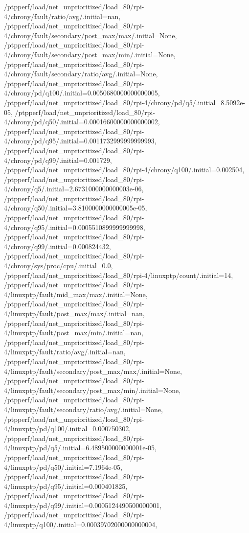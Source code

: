 {    /ptpperf/load/net_unprioritized/load_80/rpi-4/chrony/fault/ratio/avg/.initial=nan,
    /ptpperf/load/net_unprioritized/load_80/rpi-4/chrony/fault/secondary/post_max/max/.initial=None,
    /ptpperf/load/net_unprioritized/load_80/rpi-4/chrony/fault/secondary/post_max/min/.initial=None,
    /ptpperf/load/net_unprioritized/load_80/rpi-4/chrony/fault/secondary/ratio/avg/.initial=None,
    /ptpperf/load/net_unprioritized/load_80/rpi-4/chrony/pd/q100/.initial=0.0050680000000000005,
    /ptpperf/load/net_unprioritized/load_80/rpi-4/chrony/pd/q5/.initial=8.5092e-05,
    /ptpperf/load/net_unprioritized/load_80/rpi-4/chrony/pd/q50/.initial=0.00016600000000000002,
    /ptpperf/load/net_unprioritized/load_80/rpi-4/chrony/pd/q95/.initial=0.0011732999999999993,
    /ptpperf/load/net_unprioritized/load_80/rpi-4/chrony/pd/q99/.initial=0.001729,
    /ptpperf/load/net_unprioritized/load_80/rpi-4/chrony/q100/.initial=0.002504,
    /ptpperf/load/net_unprioritized/load_80/rpi-4/chrony/q5/.initial=2.6731000000000003e-06,
    /ptpperf/load/net_unprioritized/load_80/rpi-4/chrony/q50/.initial=3.8100000000000005e-05,
    /ptpperf/load/net_unprioritized/load_80/rpi-4/chrony/q95/.initial=0.0005510899999999998,
    /ptpperf/load/net_unprioritized/load_80/rpi-4/chrony/q99/.initial=0.000824432,
    /ptpperf/load/net_unprioritized/load_80/rpi-4/chrony/sys/proc/cpu/.initial=0.0,
    /ptpperf/load/net_unprioritized/load_80/rpi-4/linuxptp/count/.initial=14,
    /ptpperf/load/net_unprioritized/load_80/rpi-4/linuxptp/fault/mid_max/max/.initial=None,
    /ptpperf/load/net_unprioritized/load_80/rpi-4/linuxptp/fault/post_max/max/.initial=nan,
    /ptpperf/load/net_unprioritized/load_80/rpi-4/linuxptp/fault/post_max/min/.initial=nan,
    /ptpperf/load/net_unprioritized/load_80/rpi-4/linuxptp/fault/ratio/avg/.initial=nan,
    /ptpperf/load/net_unprioritized/load_80/rpi-4/linuxptp/fault/secondary/post_max/max/.initial=None,
    /ptpperf/load/net_unprioritized/load_80/rpi-4/linuxptp/fault/secondary/post_max/min/.initial=None,
    /ptpperf/load/net_unprioritized/load_80/rpi-4/linuxptp/fault/secondary/ratio/avg/.initial=None,
    /ptpperf/load/net_unprioritized/load_80/rpi-4/linuxptp/pd/q100/.initial=0.000750302,
    /ptpperf/load/net_unprioritized/load_80/rpi-4/linuxptp/pd/q5/.initial=6.489500000000001e-05,
    /ptpperf/load/net_unprioritized/load_80/rpi-4/linuxptp/pd/q50/.initial=7.1964e-05,
    /ptpperf/load/net_unprioritized/load_80/rpi-4/linuxptp/pd/q95/.initial=0.000401825,
    /ptpperf/load/net_unprioritized/load_80/rpi-4/linuxptp/pd/q99/.initial=0.0005124490500000001,
    /ptpperf/load/net_unprioritized/load_80/rpi-4/linuxptp/q100/.initial=0.00039702000000000004,
}
